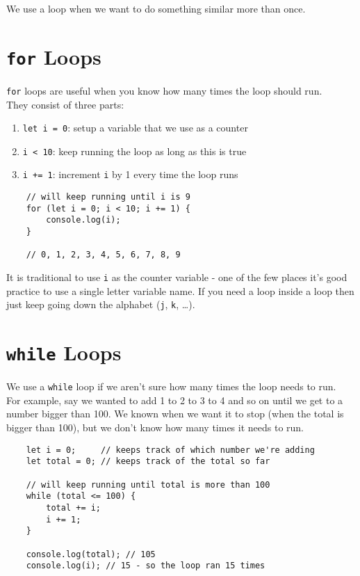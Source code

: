 We use a loop when we want to do something similar more than once.

\section{\texttt{for} Loops}

\texttt{for} loops are useful when you know how many times the loop should run.
\\

They consist of three parts:

\begin{enumerate}
    \item \texttt{let i = 0}: setup a variable that we use as a counter
    \item \texttt{i < 10}: keep running the loop as long as this is true
    \item \texttt{i += 1}: increment \texttt{i} by 1 every time the loop runs
\end{enumerate}

\begin{verbatim}
    // will keep running until i is 9
    for (let i = 0; i < 10; i += 1) {
        console.log(i);
    }

    // 0, 1, 2, 3, 4, 5, 6, 7, 8, 9
\end{verbatim}

It is traditional to use \texttt{i} as the counter variable - one of the few places it's good practice to use a single letter variable name. If you need a loop inside a loop then just keep going down the alphabet (\texttt{j}, \texttt{k}, \ldots).


\pagebreak

\section{\texttt{while} Loops}

We use a \texttt{while} loop if we aren't sure how many times the loop needs to run.
\\

For example, say we wanted to add 1 to 2 to 3 to 4 and so on until we get to a number bigger than 100. We known when we want it to stop (when the total is bigger than 100), but we don't know how many times it needs to run.

\begin{verbatim}
    let i = 0;     // keeps track of which number we're adding
    let total = 0; // keeps track of the total so far

    // will keep running until total is more than 100
    while (total <= 100) {
        total += i;
        i += 1;
    }

    console.log(total); // 105
    console.log(i); // 15 - so the loop ran 15 times
\end{verbatim}



